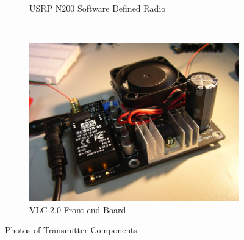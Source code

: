 \begin{figure}[!htb]
\begin{subfigure}[h]{0.1\textwidth}
  \caption{USRP N200 Software Defined Radio} \label{fig:usrp}
 \end{subfigure}
~
 \begin{subfigure}[h]{0.1\textwidth}
  \includegraphics[width=\textwidth]{fig/VLC2_0.png} 
  \caption{VLC 2.0 Front-end Board} \label{fig:VLC_frontend}
 \end{subfigure}
\caption{Photos of Transmitter Components}
\label{fig:tx_photo}
\end{figure}


